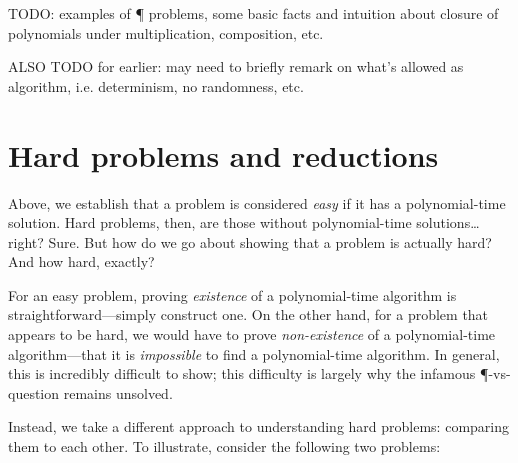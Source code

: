 TODO: examples of \P{} problems, some basic facts and intuition about closure
of polynomials under multiplication, composition, etc.

ALSO TODO for earlier: may need to briefly remark on what's allowed as
algorithm, i.e. determinism, no randomness, etc.


\section{Hard problems and reductions}

Above, we establish that a problem is considered \emph{easy} if it has a
polynomial-time solution.  Hard problems, then, are those without
polynomial-time solutions… right?  Sure.  But how do we go about showing that a
problem is actually hard?  And how hard, exactly?

For an easy problem, proving \emph{existence} of a polynomial-time algorithm is
straightforward---simply construct one.  On the other hand, for a problem that
appears to be hard, we would have to prove \emph{non-existence} of a
polynomial-time algorithm---that it is \emph{impossible} to find a
polynomial-time algorithm. In general, this is incredibly difficult to show;
this difficulty is largely why the infamous \P-vs-\NP{} question remains
unsolved.

Instead, we take a different approach to understanding hard problems: comparing
them to each other.  To illustrate, consider the following two problems:

